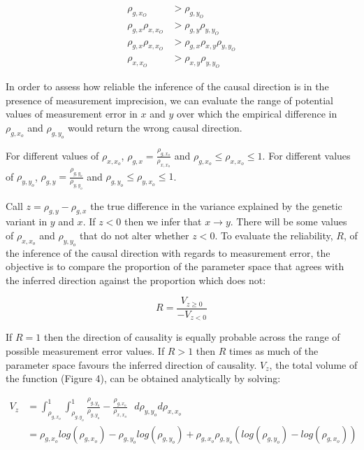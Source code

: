 \documentclass[]{article}
\begin{document}
\[
\begin{aligned}
\rho_{g, x_O} & > \rho_{g, y_O} \\
\rho_{g, x} \rho_{x, x_O} & > \rho_{g,y}\rho_{y,y_O}\\
\rho_{g, x} \rho_{x, x_O} & > \rho_{g,x}\rho_{x,y}\rho_{y,y_O}\\
\rho_{x, x_O} & > \rho_{x,y}\rho_{y,y_O}
\end{aligned}
\]

In order to assess how reliable the inference of the causal direction is
in the presence of measurement imprecision, we can evaluate the range of
potential values of measurement error in \(x\) and \(y\) over which the
empirical difference in \(\rho_{g, x_o}\) and \(\rho_{g, y_o}\) would
return the wrong causal direction.

For different values of \(\rho_{x,x_o}\),
\(\rho_{g,x} = \frac{\rho_{g, x_o}}{\rho_{x,x_o}}\) and
\(\rho_{g,x_o} \leq \rho_{x,x_o} \leq 1\). For different values of
\(\rho_{y,y_o}\), \(\rho_{g,y} = \frac{\rho_{g, y_o}}{\rho_{y,y_o}}\)
and \(\rho_{g,y_o} \leq \rho_{y,x_o} \leq 1\).

Call \(z = \rho_{g,y} - \rho_{g,x}\) the true difference in the variance
explained by the genetic variant in \(y\) and \(x\). If \(z < 0\) then
we infer that \(x \rightarrow y\). There will be some values of
\(\rho_{x,x_o}\) and \(\rho_{y,y_o}\) that do not alter whether
\(z < 0\). To evaluate the reliability, \(R\), of the inference of the
causal direction with regards to measurement error, the objective is to
compare the proportion of the parameter space that agrees with the
inferred direction against the proportion which does not:

\[
R = \frac{V_{z \geq 0}}{ - V_{z < 0} }
\]

If \(R=1\) then the direction of causality is equally probable across
the range of possible measurement error values. If \(R > 1\) then \(R\)
times as much of the parameter space favours the inferred direction of
causality. \(V_{z}\), the total volume of the function (Figure 4), can
be obtained analytically by solving:

\[
\begin{aligned}
V_z & = \int^1_{\rho_{g,x_o}} \int^1_{\rho_{g,y_o}} \frac{\rho_{g,y_o}}{\rho_{y,y_o}} - \frac{\rho_{g,x_o}}{\rho_{x,x_o}}\,\,\,\, d\rho_{y,y_o}d\rho_{x,x_o} \\
& = \rho_{g,x_o}log(\rho_{g,x_o}) - \rho_{g,y_o}log(\rho_{g,y_o}) + \rho_{g,x_o}\rho_{g,y_o}(log(\rho_{g,y_o})-log(\rho_{g,x_o}))
\end{aligned}
\]
\end{document}
